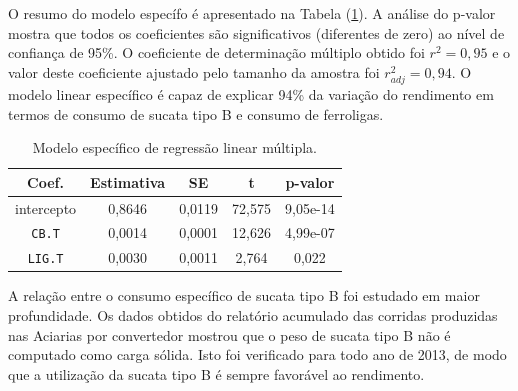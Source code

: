 \begin{multicols}{2}
	O resumo do modelo específo é apresentado na Tabela (\ref{tab:mod_esp}). A análise do p-valor mostra que todos os coeficientes são significativos (diferentes de zero) ao nível de confiança de 95\%. O coeficiente de determinação múltiplo obtido foi $r^2=0,95$ e o valor deste coeficiente ajustado pelo tamanho da amostra foi $r_{adj}^2=0,94$. O modelo linear específico é capaz de explicar 94\% da variação do rendimento em termos de consumo de sucata tipo B e consumo de ferroligas.
	\begin{table}[H]
	\begin{center}
	\begin{small}
		\caption{Modelo específico de regressão linear múltipla.}
		\label{tab:mod_esp}
			\begin{tabular}{ccccc}
				\hline
				Coef. & Estimativa & SE & t & p-valor \\
				\hline \hline
				intercepto		&  0,8646  & 0,0119 &  72,575 & 9,05e-14 \\
				\texttt{CB.T}	&  0,0014  & 0,0001 &  12,626 & 4,99e-07 \\
				\texttt{LIG.T}	&  0,0030  & 0,0011 &   2,764 &    0,022 \\
				\hline
			\end{tabular}
			\end{small}
			\end{center}
	\end{table}						
	A relação entre o consumo específico de sucata tipo B foi estudado em maior profundidade. Os dados obtidos do relatório acumulado das corridas produzidas nas Aciarias por convertedor\cite{rel4} mostrou que o peso de sucata tipo B não é computado como carga sólida. Isto foi verificado para todo ano de 2013, de modo que a utilização da sucata tipo B é sempre favorável ao rendimento.
	

\end{multicols}
